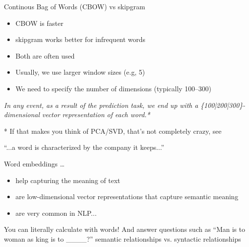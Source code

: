 \begin{frame}{Continous Bag of Words (CBOW) vs skipgram}
  \begin{itemize}
  \item CBOW is faster
  \item skipgram works better for infrequent words
  \item Both are often used
  \item Usually, we use larger window sizes (e.g, 5)
  \item We need to specify the number of dimensions (typically 100--300)
  \end{itemize}
  \pause
  
  \textit{In any event, as a result of the prediction task, we end up with a \{100|200|300\}-dimensional vector representation of each word.*}
  
  
  \tiny{* If that makes you think of PCA/SVD, that's not completely crazy, see \cite{Levy2018}}\\
\end{frame}




\begin{frame}{``...a word is characterized by the company it keeps...''\parencite{Firth1957}}
  \begin{block}{Word embeddings \ldots}
    \begin{itemize}
    \item help capturing the meaning of text
    \item are low-dimensional vector representations that capture semantic meaning
    \item are very common in NLP...
    \end{itemize}
  \end{block}

\end{frame}



\begin{frame}{You can literally calculate with words!}
	And answer questions such as ``Man is to woman as king is to \_\_\_\_?''
	semantic relationships vs. syntactic relationships
\end{frame}

